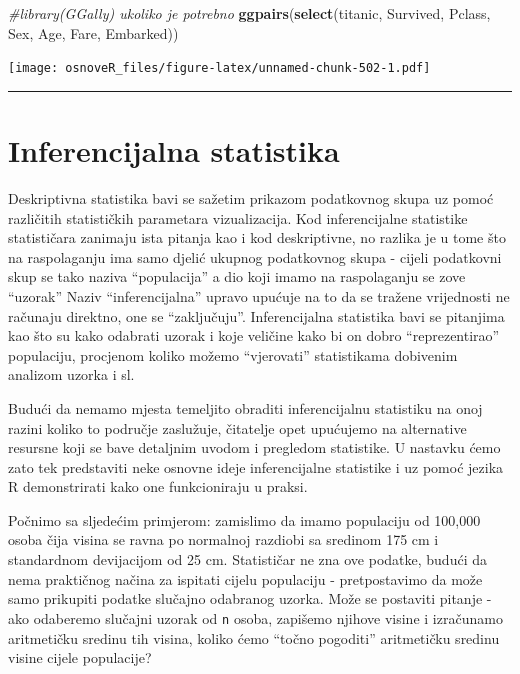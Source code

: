 \documentclass[]{book}
\newenvironment{Shaded}{\begin{snugshade}}{\end{snugshade}}
\newcommand{\KeywordTok}[1]{\textcolor[rgb]{0.13,0.29,0.53}{\textbf{#1}}}
\newcommand{\CommentTok}[1]{\textcolor[rgb]{0.56,0.35,0.01}{\textit{#1}}}
\newcommand{\NormalTok}[1]{#1}
\theoremstyle{definition}
\theoremstyle{definition}
\theoremstyle{definition}
\theoremstyle{remark}
\begin{document}
\begin{Shaded}
\begin{Highlighting}[]
\CommentTok{#library(GGally) ukoliko je potrebno}
\KeywordTok{ggpairs}\NormalTok{(}\KeywordTok{select}\NormalTok{(titanic, Survived, Pclass, Sex, Age, Fare, Embarked))}
\end{Highlighting}
\end{Shaded}

\texttt{[image: osnoveR\_files/figure-latex/unnamed-chunk-502-1.pdf]}

\begin{center}\rule{0.5\linewidth}{\linethickness}\end{center}

\section{Inferencijalna statistika}\label{inferencijalna-statistika}

Deskriptivna statistika bavi se sažetim prikazom podatkovnog skupa uz
pomoć različitih statističkih parametara vizualizacija. Kod
inferencijalne statistike statističara zanimaju ista pitanja kao i kod
deskriptivne, no razlika je u tome što na raspolaganju ima samo djelić
ukupnog podatkovnog skupa - cijeli podatkovni skup se tako naziva
``populacija'' a dio koji imamo na raspolaganju se zove ``uzorak'' Naziv
``inferencijalna'' upravo upućuje na to da se tražene vrijednosti ne
računaju direktno, one se ``zaključuju''. Inferencijalna statistika bavi
se pitanjima kao što su kako odabrati uzorak i koje veličine kako bi on
dobro ``reprezentirao'' populaciju, procjenom koliko možemo
``vjerovati'' statistikama dobivenim analizom uzorka i sl.

Budući da nemamo mjesta temeljito obraditi inferencijalnu statistiku na
onoj razini koliko to područje zaslužuje, čitatelje opet upućujemo na
alternative resursne koji se bave detaljnim uvodom i pregledom
statistike. U nastavku ćemo zato tek predstaviti neke osnovne ideje
inferencijalne statistike i uz pomoć jezika R demonstrirati kako one
funkcioniraju u praksi.

Počnimo sa sljedećim primjerom: zamislimo da imamo populaciju od 100,000
osoba čija visina se ravna po normalnoj razdiobi sa sredinom 175 cm i
standardnom devijacijom od 25 cm. Statističar ne zna ove podatke, budući
da nema praktičnog načina za ispitati cijelu populaciju - pretpostavimo
da može samo prikupiti podatke slučajno odabranog uzorka. Može se
postaviti pitanje - ako odaberemo slučajni uzorak od \texttt{n} osoba,
zapišemo njihove visine i izračunamo aritmetičku sredinu tih visina,
koliko ćemo ``točno pogoditi'' aritmetičku sredinu visine cijele
populacije?
\end{document}
